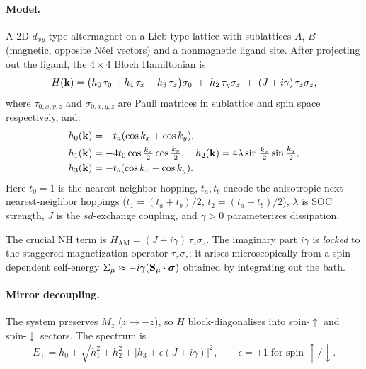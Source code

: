 \documentclass[11pt,a4paper]{article}
\begin{document}
\paragraph{Model.}
A 2D $d_{xy}$-type altermagnet on a Lieb-type lattice with sublattices $A$, $B$ (magnetic, opposite N\'eel vectors) and a nonmagnetic ligand site.  After projecting out the ligand, the $4\times 4$ Bloch Hamiltonian is
\begin{equation}\label{eq:ham}
  H(\vb{k}) = \bigl(h_0\,\tau_0 + h_1\,\tau_x + h_3\,\tau_z\bigr)\sigma_0
  \;+\; h_2\,\tau_y\sigma_z
  \;+\; (J + i\gamma)\,\tau_z\sigma_z,
\end{equation}
where $\tau_{0,x,y,z}$ and $\sigma_{0,x,y,z}$ are Pauli matrices in sublattice and spin space respectively, and:
\begin{align}
  h_0(\vb{k}) &= -t_a(\cos k_x + \cos k_y), \notag\\
  h_1(\vb{k}) &= -4t_0\cos\tfrac{k_x}{2}\cos\tfrac{k_y}{2}, \quad
  h_2(\vb{k}) = 4\lambda\sin\tfrac{k_x}{2}\sin\tfrac{k_y}{2}, \notag\\
  h_3(\vb{k}) &= -t_b(\cos k_x - \cos k_y). \label{eq:hfns}
\end{align}
Here $t_0=1$ is the nearest-neighbor hopping, $t_a,t_b$ encode the anisotropic next-nearest-neighbor hoppings ($t_1 = (t_a+t_b)/2$, $t_2 = (t_a-t_b)/2$), $\lambda$ is SOC strength, $J$ is the $sd$-exchange coupling, and $\gamma > 0$ parameterizes dissipation.

The crucial NH term is $\boxed{H_{\text{AM}} = (J+i\gamma)\,\tau_z\sigma_z}$.  The imaginary part $i\gamma$ is \emph{locked} to the staggered magnetization operator $\tau_z\sigma_z$; it arises microscopically from a spin-dependent self-energy $\Sigma_\mu \approx -i\gamma(\vb{S}_\mu\cdot\boldsymbol{\sigma})$ obtained by integrating out the bath.

\paragraph{Mirror decoupling.}
The system preserves $M_z$ ($z\to -z$), so $H$ block-diagonalises into spin-$\uparrow$ and spin-$\downarrow$ sectors.  The spectrum is
\begin{equation}\label{eq:spectrum}
  E_\pm = h_0 \pm \sqrt{h_1^2 + h_2^2 + \bigl[h_3 + \epsilon(J+i\gamma)\bigr]^2},
  \qquad \epsilon = \pm 1 \;\text{for spin }\uparrow/\downarrow.
\end{equation}

\end{document}
